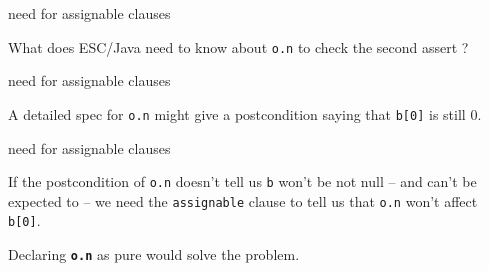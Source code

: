 \documentclass[
pdf,
nocolorBG,
slideColor,
cok,
]{prosper}
\newcommand{\code}[1]{{\rm \texttt{\textbf{\scriptsize #1}}}}
\begin{document}
\begin{slide}{need for assignable clauses}
\vspace*{-6ex}

What does ESC/Java need to know about \texttt{o.n} to check the second assert ?

\end{slide}

\begin{slide}{need for assignable clauses}
\vspace*{-6ex}


A detailed spec for \texttt{o.n} might give a postcondition saying
that \texttt{b[0]} is still 0.

\end{slide}


\begin{slide}{need for assignable clauses}
\vspace*{-6ex}


If the postcondition of \texttt{o.n} doesn't tell us \texttt{b} won't be not null
-- and can't be expected to -- we need the \texttt{assignable} clause to
tell us that \texttt{o.n} won't affect \texttt{b[0]}.

\medskip

{\scriptsize Declaring \texttt{\textbf{o.n}} as pure would solve the problem.}

\end{slide}
\end{document}
